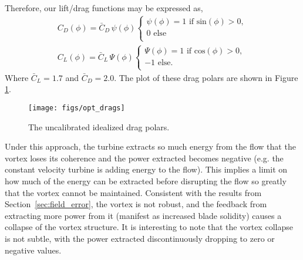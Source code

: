 Therefore, our lift/drag functions may be expressed as,
\begin{align*} 
 C_D(\phi) = \bar C_D \, \psi(\phi) 
  \begin{cases}
   \psi(\phi) = 1 \text{ if sin}(\phi) > 0,   \\
   0 \text{ else} \\
  \end{cases} \\
 C_L(\phi) = \bar C_L \, \Psi(\phi) 
  \begin{cases}
   \Psi(\phi) = 1 \text{ if cos}(\phi) > 0,   \\
   -1 \text{ else}. \\
  \end{cases}
\end{align*}
Where $\bar C_L = 1.7$ and $\bar C_D = 2.0$. The plot of these drag
polars are shown in Figure \ref{drags}. 

\begin{figure}[!htb]
  \begin{center}
    \texttt{[image: figs/opt\_drags]}
    \caption{The uncalibrated idealized drag polars.} 
    \label{drags}
  \end{center}
\end{figure}


Under this approach, the turbine extracts so much energy from the flow
that the vortex loses its coherence and the power extracted becomes
negative (e.g. the constant velocity turbine is adding energy to the
flow). %
This implies a limit on how much of the energy can be extracted before
disrupting the flow so greatly that the vortex cannot be maintained.   
Consistent with the results from Section~\ref{sec:field_error},
the vortex is not robust, and the feedback from extracting more power
from it (manifest as increased blade solidity) causes a collapse of the
vortex structure. It is interesting to note that the vortex collapse is
not subtle, with the power extracted discontinuously dropping to zero or
negative values. 


